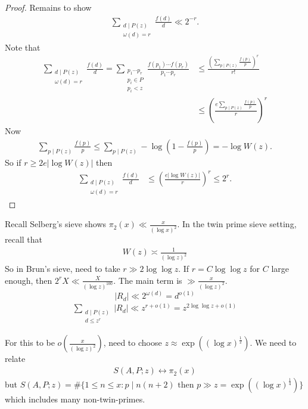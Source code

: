 \documentclass{article}
\begin{document}
\begin{proof}
  Remains to show
  \begin{align*}
    \sum_{\substack{d \mid P(z) \\ \omega(d) = r}} \frac{f(d)}{d} \ll 2^{-r}.
  \end{align*}
  Note that
  \begin{align*}
    \sum_{\substack{d \mid P(z) \\ \omega(d) = r}} \frac{f(d)}{d} = \sum_{\substack{p_1 \dotsm p_r \\ p_i \in P \\ p_i < z}} \frac{f(p_1) \dotsm f(p_r)}{p_1 \dotsm p_r} &\leq \frac{\left(\sum_{p \mid P(z)} \frac{f(p)}{p}\right)^r}{r!} \\
                                                                                                                                                                         &\leq \left(\frac{e \sum_{p \mid P(z)} \frac{f(p)}{p}}{r}\right)^r
  \end{align*}
  Now
  \begin{align*}
    \sum_{p \mid P(z)} \frac{f(p)}{p} \leq \sum_{p \mid P(z)} - \log\left(1 - \frac{f(p)}{p}\right) = - \log W(z).
  \end{align*}
  So if $r \geq 2 e |\log W(z)|$ then
  \begin{align*}
    \sum_{\substack{d \mid P(z) \\ \omega(d) = r}} \frac{f(d)}{d}&\leq \left(\frac{e |\log W(z)|}{r}\right)^r \leq 2^r.
  \end{align*}
\end{proof}

Recall Selberg's sieve shows $\pi_2(x) \ll \frac{x}{(\log x)^2}$.
In the twin prime sieve setting, recall that
\begin{align*}
  W(z) \asymp \frac{1}{(\log z)^2}
\end{align*}
So in Brun's sieve, need to take $r \gg 2 \log \log z$.
If $r = C \log \log z$ for $C$ large enough, then $2^r X \ll \frac{X}{(\log z)^{100}}$.
The main term is $\gg \frac{x}{(\log z)^2}$.
\begin{equation*}
  |R_d| \ll 2^{\omega(d)} = d^{o(1)}
\end{equation*}
\begin{align*}
  \sum_{\substack{d \mid P(z) \\ d \leq z^r}} |R_d| \ll z^{r + o(1)} = z^{2 \log \log z + o(1)}
\end{align*}

For this to be $o(\frac{x}{(\log z)^2})$, need to choose $z \approx \exp((\log x)^{\frac 12})$.
We need to relate
\begin{align*}
  S(A,P;z) \leftrightarrow \pi_2(x)
\end{align*}
but $S(A,P;z) = \#\{1 \leq n \leq x : p \mid n(n+2) \text{ then } p \gg z = \exp((\log x)^{\frac 14})\}$
which includes many non-twin-primes.
\end{document}
